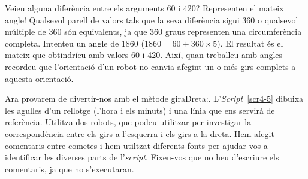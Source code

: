 Veieu alguna diferència entre els arguments 60 i 420? Representen el mateix angle! Qualsevol parell de valors tals que la seva diferència sigui 360 o qualsevol múltiple de 360 són equivalents, ja que 360 graus representen una circumferència completa. Intenteu un angle de 1860 ($1860 = 60 + 360 \times 5$). El resultat és el mateix que obtindríeu amb valors 60 i 420. Així, quan treballeu amb angles recordeu que l'orientació d'un robot no canvia afegint un o més girs complets a aquesta orientació.

Ara provarem de divertir-nos amb el mètode \textsf{giraDreta:}. L'\emph{Script}~\ref{scr4-5} dibuixa les agulles d'un rellotge (l'hora i els minuts) i una línia que ens servirà de referència. Utilitza dos robots, que podeu utilitzar per investigar la correspondència entre els girs a l'esquerra i els girs a la dreta. Hem afegit comentaris entre cometes i hem utiltzat diferents fonts per ajudar-vos a identificar les diverses parts de l'\emph{script}. Fixeu-vos que no heu d'escriure els comentaris, ja que no s'executaran. 

